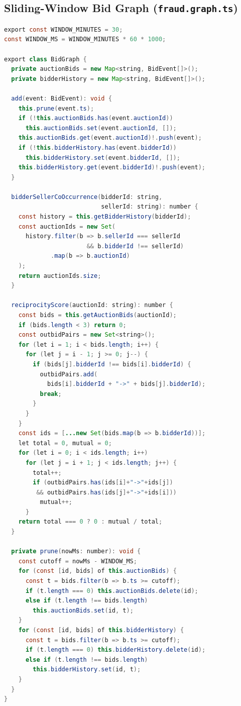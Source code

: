 \documentclass[11pt]{article}
\begin{document}
\subsection{Sliding-Window Bid Graph (\texttt{fraud.graph.ts})}

\begin{lstlisting}[language=Java,caption={In-memory sliding-window bid graph with lazy pruning.}]
export const WINDOW_MINUTES = 30;
const WINDOW_MS = WINDOW_MINUTES * 60 * 1000;

export class BidGraph {
  private auctionBids = new Map<string, BidEvent[]>();
  private bidderHistory = new Map<string, BidEvent[]>();

  add(event: BidEvent): void {
    this.prune(event.ts);
    if (!this.auctionBids.has(event.auctionId))
      this.auctionBids.set(event.auctionId, []);
    this.auctionBids.get(event.auctionId)!.push(event);
    if (!this.bidderHistory.has(event.bidderId))
      this.bidderHistory.set(event.bidderId, []);
    this.bidderHistory.get(event.bidderId)!.push(event);
  }

  bidderSellerCoOccurrence(bidderId: string,
                           sellerId: string): number {
    const history = this.getBidderHistory(bidderId);
    const auctionIds = new Set(
      history.filter(b => b.sellerId === sellerId
                       && b.bidderId !== sellerId)
             .map(b => b.auctionId)
    );
    return auctionIds.size;
  }

  reciprocityScore(auctionId: string): number {
    const bids = this.getAuctionBids(auctionId);
    if (bids.length < 3) return 0;
    const outbidPairs = new Set<string>();
    for (let i = 1; i < bids.length; i++) {
      for (let j = i - 1; j >= 0; j--) {
        if (bids[j].bidderId !== bids[i].bidderId) {
          outbidPairs.add(
            bids[i].bidderId + "->" + bids[j].bidderId);
          break;
        }
      }
    }
    const ids = [...new Set(bids.map(b => b.bidderId))];
    let total = 0, mutual = 0;
    for (let i = 0; i < ids.length; i++)
      for (let j = i + 1; j < ids.length; j++) {
        total++;
        if (outbidPairs.has(ids[i]+"->"+ids[j])
         && outbidPairs.has(ids[j]+"->"+ids[i]))
          mutual++;
      }
    return total === 0 ? 0 : mutual / total;
  }

  private prune(nowMs: number): void {
    const cutoff = nowMs - WINDOW_MS;
    for (const [id, bids] of this.auctionBids) {
      const t = bids.filter(b => b.ts >= cutoff);
      if (t.length === 0) this.auctionBids.delete(id);
      else if (t.length !== bids.length)
        this.auctionBids.set(id, t);
    }
    for (const [id, bids] of this.bidderHistory) {
      const t = bids.filter(b => b.ts >= cutoff);
      if (t.length === 0) this.bidderHistory.delete(id);
      else if (t.length !== bids.length)
        this.bidderHistory.set(id, t);
    }
  }
}
\end{lstlisting}
\end{document}
